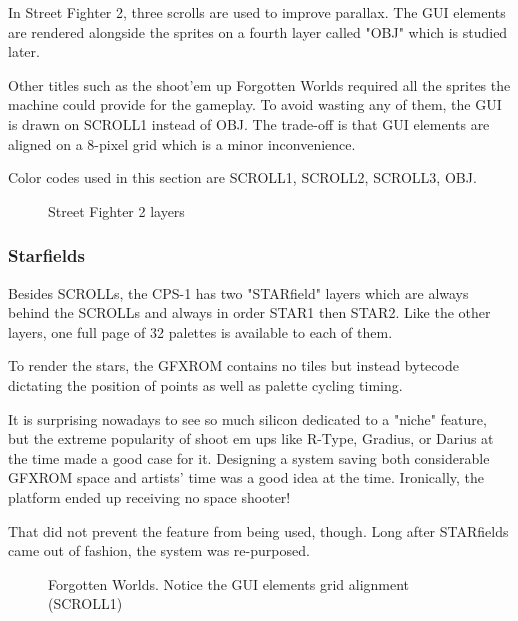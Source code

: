 In Street Fighter 2, three scrolls are used to improve parallax. The GUI elements are rendered alongside the sprites on a fourth layer called "OBJ" which is studied later.

Other titles such as the shoot'em up Forgotten Worlds required all the sprites the machine could provide for the gameplay. To avoid wasting any of them, the GUI is drawn on SCROLL1 instead of OBJ. The trade-off is that GUI elements are aligned on a 8-pixel grid which is a minor inconvenience.

Color codes used in this section are  SCROLL1,  SCROLL2,  SCROLL3,  OBJ.

\vfill
\begin{figure}[!b]
 \caption*{Street Fighter 2 layers}%
 \end{figure}%
\pagebreak


\subsubsection{Starfields}
Besides SCROLLs, the CPS-1 has two "STARfield" layers which are always behind the SCROLLs and always in order STAR1 then STAR2. Like the other layers, one full page of 32 palettes is available to each of them.

To render the stars, the GFXROM contains no tiles but instead bytecode dictating the position of points as well as palette cycling timing.

It is surprising nowadays to see so much silicon dedicated to a "niche" feature, but the extreme popularity of shoot
em ups like R-Type, Gradius, or Darius at the time made a good case for it. Designing a system saving both considerable GFXROM space and artists' time was a good idea at the time. Ironically, the platform ended up receiving no space shooter! 

That did not prevent the feature from being used, though. Long after STARfields came out of fashion, the system was re-purposed.




\vfill
\begin{figure}[!b]
 \caption*{Forgotten Worlds. Notice the GUI elements grid alignment (SCROLL1)}%
 \end{figure}%
\pagebreak


